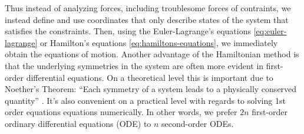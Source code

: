Thus instead of analyzing forces, including troublesome forces of contraints, we instead define and use coordinates that only describe states of the system that satisfies the constraints. Then, using the Euler-Lagrange's equations \eqref{eq:euler-lagrange} or Hamilton's equations \eqref{eq:hamiltons-equations}, we immediately obtain the equations of motion. Another advantage of the Hamiltonian method is that the underlying symmetries in the system are often more evident in first-order differential equations. On a theoretical level this is important due to Noether's Theorem: ``Each symmetry of a system leads to a physically conserved quantity'' \cite{noethers}. It's also convenient on a practical level with regards to solving 1st order equations equations numerically. In other words, we prefer $2 n$ first-order ordinary differential equations (ODE) to $n$ second-order ODEs.



